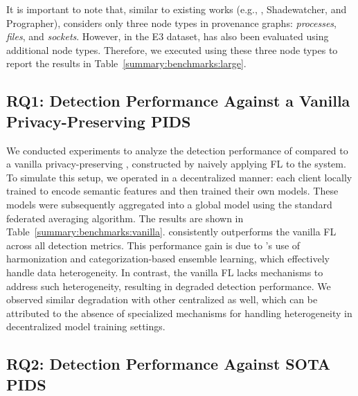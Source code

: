 It is important to note that, similar to existing works (e.g., \kairos, Shadewatcher, and Prographer), \Sys considers only three node types in provenance graphs: \emph{processes}, \emph{files}, and \emph{sockets}. However, in the E3 dataset, \flash has also been evaluated using additional node types. Therefore, we executed \flash using these three node types to report the results in Table~\ref{summary:benchmarks:large}.

\subsection{RQ1: Detection Performance Against a Vanilla Privacy-Preserving PIDS}
\label{sub:detect:perf:vanilla}


We conducted experiments to analyze the detection performance of \Sys compared to a vanilla privacy-preserving \pids, constructed by naively applying FL to the \flash system. To simulate this setup, we operated \flash in a decentralized manner: each client locally trained \wordvec to encode semantic features and then trained their own \gnnshort models. These models were subsequently aggregated into a global model using the standard federated averaging algorithm. The results are shown in Table~\ref{summary:benchmarks:vanilla}. \Sys consistently outperforms the vanilla FL \flash across all detection metrics. This performance gain is due to \Sys’s use of \wordvec harmonization and categorization-based ensemble learning, which effectively handle data heterogeneity. In contrast, the vanilla FL \flash lacks mechanisms to address such heterogeneity, resulting in degraded detection performance. We observed similar degradation with other centralized \pids as well, which can be attributed to the absence of specialized mechanisms for handling heterogeneity in decentralized model training settings.

 \subsection{RQ2: Detection Performance Against SOTA PIDS}
 \label{sub:detect:perf}

